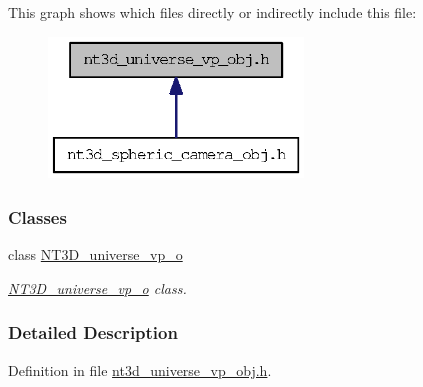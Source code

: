 This graph shows which files directly or indirectly include this file:
\nopagebreak
\begin{figure}[H]
\begin{center}
\leavevmode
\includegraphics[width=192pt]{nt3d__universe__vp__obj_8h__dep__incl}
\end{center}
\end{figure}
\subsubsection*{Classes}
\begin{DoxyCompactItemize}
\item 
class \hyperlink{class_n_t3_d__universe__vp__o}{NT3D\_\-universe\_\-vp\_\-o}
\begin{DoxyCompactList}\small\item\em \hyperlink{class_n_t3_d__universe__vp__o}{NT3D\_\-universe\_\-vp\_\-o} class. \item\end{DoxyCompactList}\end{DoxyCompactItemize}


\subsubsection{Detailed Description}


Definition in file \hyperlink{nt3d__universe__vp__obj_8h_source}{nt3d\_\-universe\_\-vp\_\-obj.h}.


